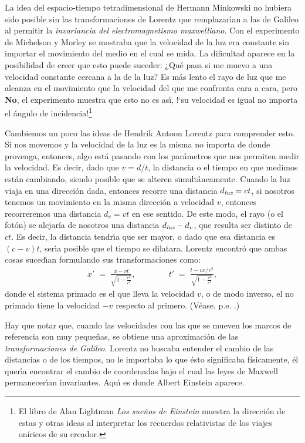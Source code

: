 \documentclass[12pt]{article}
\begin{document}
La idea del espacio-tiempo tetradimensional de Hermann Minkowski no hubiera sido posible sin las transformaciones de Lorentz que remplazar\'{\i}an a las de Galileo al permitir la {\it invariancia del electromagnetismo maxwelliano}. Con el experimento de Michelson y Morley se mostraba que la velocidad de la luz era constante sin importar el movimiento del medio en el cual se mida. La dificultad aparece en la posibilidad de creer que esto puede suceder: \guillemotleft¿Qu\'e pasa si me muevo a una velocidad constante cercana a la de la luz? Es m\'as lento el rayo de luz que me alcanza en el movimiento que la velocidad del que me confronta cara a cara\guillemotright, pero \guillemotleft\/{\bf No}, el experimento muestra que esto no es as\'{\i}, !`su velocidad es igual no importa el \'angulo de incidencia!\guillemotright \footnote{El libro de Alan Lightman \textit{Los sueños de Einstein} muestra la dirección de estas y otras ideas al interpretar los recuerdos relativistas de los viajes oníricos de su creador.}

Cambiemos un poco las ideas de Hendrik Antoon Lorentz para comprender esto. Si nos movemos y la velocidad de la luz es la misma no importa de donde provenga, entonces, algo está pasando con los par\'ametros que nos permiten medir la velocidad. Es decir, dado que $v = d/t$, la distancia o el tiempo en que medimos est\'an cambiando, siendo posible que se alteren simult\'aneamente. Cuando la luz viaja en una direcci\'on dada, entonces recorre una distancia $d_\text{\it luz} = ct$, si nosotros tenemos un movimiento en la misma direcci\'on a velocidad $v$, entonces recorreremos una distancia $d_{v} = vt$ en ese sentido. De este modo, el rayo (o el fot\'on) se alejaría de nosotros una distancia $d_\text{\it luz} - d_{v}$, que resulta ser distinto de $ct$. Es decir, la distancia tendr\'{\i}a que ser mayor, o dado que esa distancia es $(c-v)t$, ser\'{\i}a posible que el tiempo se dilatara. Lorentz encontr\'o que ambas cosas suced\'{\i}an formulando sus transformaciones como:
\begin{eqnarray*}
x' \;=\; \frac{x-vt}{\sqrt{1-\frac{v^2}{c^2}}}, \qquad\qquad
t' \;=\; \frac{t-vx/c^2}{\sqrt{1-\frac{v^2}{c^2}}},
\end{eqnarray*}
donde el sistema primado es el que lleva la velocidad $v$, o de modo inverso, el no primado tiene la velocidad $-v$ respecto al primero. (Véase, p.e. \cite{Wa}.)

Hay que notar que, cuando las velocidades con las que se mueven los marcos de referencia son muy peque\~nas, se obtiene una aproximaci\'on de las \textit{transformaciones de Galileo}.
Lorentz no buscaba entender el cambio de las distancias o de los tiempos, no le importaba lo que ésto significaba físicamente, él quer\'{\i}a encontrar el cambio de coordenadas bajo el cual las leyes de Maxwell permanecer\'{\i}an invariantes. Aqu\'{\i} es donde Albert Einstein aparece.
\end{document}
